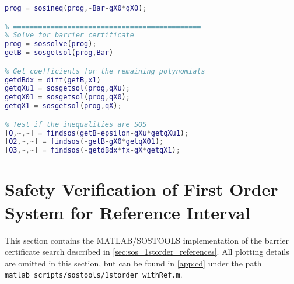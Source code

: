 \begin{lstlisting}[language=matlab]
prog = sosineq(prog,-Bar-gX0*qX0);

% =============================================
% Solve for barrier certificate
prog = sossolve(prog);
getB = sosgetsol(prog,Bar)

% Get coefficients for the remaining polynomials
getdBdx = diff(getB,x1)
getqXu1 = sosgetsol(prog,qXu);
getqX01 = sosgetsol(prog,qX0);
getqX1 = sosgetsol(prog,qX);

% Test if the inequalities are SOS
[Q,~,~] = findsos(getB-epsilon-gXu*getqXu1);
[Q2,~,~] = findsos(-getB-gX0*getqX01);
[Q3,~,~] = findsos(-getdBdx*fx-gX*getqX1);
\end{lstlisting}

\section{Safety Verification of First Order System for Reference Interval}\label{app:sos_refinterval}
This section contains the MATLAB/SOSTOOLS implementation of the barrier certificate search described in \autoref{sec:sos_1storder_references}. All plotting details are omitted in this section, but can be found in \autoref{app:cd} under the path \texttt{matlab\_scripts/sostools/1storder\_withRef.m}.

